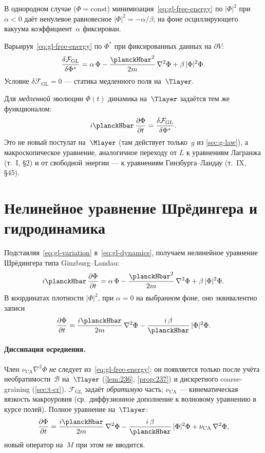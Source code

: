 В однородном случае ($\Phi=\mathrm{const}$) минимизация~\eqref{eq:gl-free-energy} по $|\Phi|^2$
при $\alpha<0$ даёт ненулевое равновесное $|\Phi|^2=-\alpha/\beta$;
на фоне осциллирующего вакуума коэффициент~$\alpha$ фиксирован.

Варьируя~\eqref{eq:gl-free-energy} по $\Phi^*$ при фиксированных данных на $\partial V$:
\begin{equation}
\label{eq:gl-variation}
  \frac{\delta\mathcal{F}_{\mathrm{GL}}}{\delta\Phi^*}
  = \alpha\,\Phi
  - \frac{\planckHbar^2}{2m}\,\nabla^2\Phi
  + \beta\,|\Phi|^2\Phi.
\end{equation}
Условие $\delta\mathcal{F}_{\mathrm{GL}}=0$ --- статика медленного поля на~$\Tlayer$.

Для \emph{медленной} эволюции $\Phi(t)$ динамика на~$\Tlayer$ задаётся тем же функционалом:
\begin{equation}
\label{eq:gl-dynamics}
  i\planckHbar\,\frac{\partial\Phi}{\partial t}
  = \frac{\delta\mathcal{F}_{\mathrm{GL}}}{\delta\Phi^*}.
\end{equation}
Это не новый постулат на~$\Mlayer$ (там действует только~$g$ из \cref{sec:g-law}),
а макроскопическое уравнение, аналогичное переходу от $L$ к уравнениям Лагранжа
(т.~I, \S2) и от свободной энергии --- к уравнениям Гинзбурга--Ландау (т.~IX, \S45).

\section{Нелинейное уравнение Шрёдингера и гидродинамика}
\label{sec:nlse-hydro}

Подставляя~\eqref{eq:gl-variation} в~\eqref{eq:gl-dynamics}, получаем нелинейное уравнение
Шрёдингера типа Ginzburg--Landau:
\begin{equation}
\label{eq:nlse-gl}
  i\planckHbar\,\frac{\partial\Phi}{\partial t}
  = \alpha\,\Phi
  - \frac{\planckHbar^2}{2m}\,\nabla^2\Phi
  + \beta\,|\Phi|^2\Phi.
\end{equation}
В координатах плотности $|\Phi|^2$, при $\alpha=0$ на выбранном фоне, оно эквивалентно записи
\begin{equation}
\label{eq:nlse-gl-real}
  \frac{\partial\Phi}{\partial t}
  = \frac{i\planckHbar}{2m}\,\nabla^2\Phi
  - \frac{i\,\beta}{\planckHbar}\,|\Phi|^2\Phi.
\end{equation}

\paragraph{Диссипация осреднения.}
Член $\nu_{\mathrm{CA}}\nabla^2\Phi$ \emph{не} следует из~\eqref{eq:gl-free-energy}:
он появляется только после учёта необратимости~$\mathcal{B}$ на~$\Tlayer$
(\cref{lem:236}, \cref{prop:237}) и дискретного coarse-graining (\cref{sec:t-cr}).
$\mathcal{F}_{\mathrm{GL}}$ задаёт \emph{обратимую} часть; $\nu_{\mathrm{CA}}$ --- кинематическая вязкость
макроуровня (ср.~диффузионное дополнение к волновому уравнению в курсе полей).
Полное уравнение на~$\Tlayer$:
\[
  \frac{\partial\Phi}{\partial t}
  = \frac{i\planckHbar}{2m}\,\nabla^2\Phi
  - \frac{i\,\beta}{\planckHbar}\,|\Phi|^2\Phi
  + \nu_{\mathrm{CA}}\,\nabla^2\Phi,
\]
новый оператор на~$M$ при этом не вводится.

